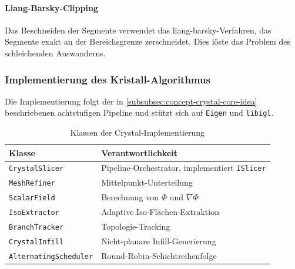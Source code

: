                 \paragraph{Liang-Barsky-Clipping}\label{para:impl-base-clipping}
                    Das Beschneiden der Segmente verwendet das \gls{liang-barsky}-Verfahren, das Segmente exakt an der Bereichsgrenze zerschneidet.
                    Dies löste das Problem des schleichenden Auswanderns.

            \subsubsection{Implementierung des Kristall-Algorithmus}\label{subsubsec:impl-crystal-algorithm}
                Die Implementierung folgt der in \cref{subsubsec:concept-crystal-core-idea} beschriebenen achtstufigen Pipeline und stützt sich auf \texttt{Eigen} und \texttt{libigl}.

                \begin{table}[ht]
                    \centering
                    \caption[Klassen der Crystal-Implementierung]{%
                        Klassen der Crystal-Implementierung%
                    }
                    \label{tab:impl-crystal-classes}
                    \renewcommand{\arraystretch}{1.2}
                    \begin{tabular}{@{} l p{7.0cm} @{}}
                        \toprule
                        \textbf{Klasse} & \textbf{Verantwortlichkeit} \\
                        \midrule
                        \texttt{CrystalSlicer}     & Pipeline-Orchestrator, implementiert \texttt{ISlicer} \\
                        \texttt{MeshRefiner}       & Mittelpunkt-Unterteilung \\
                        \texttt{ScalarField}       & Berechnung von $\Phi$ und $\nabla\Phi$ \\
                        \texttt{IsoExtractor}      & Adaptive Iso-Flächen-Extraktion \\
                        \texttt{BranchTracker}     & Topologie-Tracking \\
                        \texttt{CrystalInfill}     & Nicht-planare Infill-Generierung \\
                        \texttt{AlternatingScheduler} & Round-Robin-Schichtreihenfolge \\
                        \bottomrule
                    \end{tabular}
                \end{table}

